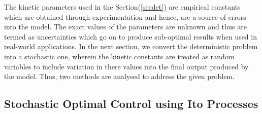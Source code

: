 \documentclass[3p,times,authoryear]{elsarticle}
\begin{document}
The kinetic parameters used in the Section(\ref{secdet}) are empirical constants which are obtained through experimentation and hence, are a source of errors into the model. The exact values of the parameters are unknown and thus are termed as uncertainties which go on to produce sub-optimal results when used in real-world applications. In the next section, we convert the deterministic problem into a stochastic one, wherein the kinetic constants are treated as random variables to include variation in there values into the final output produced by the model. Thus, two methods are analysed to address the given problem. 

\subsection{Stochastic Optimal Control using Ito Processes}
\end{document}
